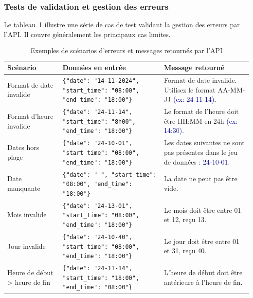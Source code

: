 \subsubsection{Tests de validation et gestion des erreurs}
Le tableau~\ref{tab:erreurs-api} illustre une série de cas de test validant la gestion des erreurs par l'API. Il couvre généralement les principaux cas limites.
\vspace{-1em}
\begin{table}[H]
	\centering
	\renewcommand{\arraystretch}{0.5}
	\caption{Exemples de scénarios d'erreurs et messages retournés par l'API}
	\vspace{-0.5em}
	\begin{tabularx}{\textwidth}{l X X}
		\toprule
		\textbf{Scénario} & \textbf{Données en entrée} & \textbf{Message retourné} \\
		\midrule
		Format de date invalide &
		\texttt{\{"date": "14-11-2024", "start\_time": "08:00", "end\_time": "18:00"\}} &
		Format de date invalide. Utilisez le format AA-MM-JJ \textcolor{darkblue}{(ex: 24-11-14)}. \\
		
		\midrule
		Format d'heure invalide &
		\texttt{\{"date": "24-11-14", "start\_time": "8h00", "end\_time": "18:00"\}} &
		Le format de l'heure doit être HH:MM en 24h \textcolor{darkblue}{(ex: 14:30)}. \\
		
		\midrule
		Dates hors plage &
		\texttt{\{"date": "24-10-01", "start\_time": "08:00", "end\_time": "18:00"\}} &
		Les dates suivantes ne sont pas présentes dans le jeu de données : \textcolor{darkblue}{24-10-01}. \\
		
		\midrule
		Date manquante &
		\texttt{\{"date": " ", "start\_time": "08:00", "end\_time": "18:00"\}} &
		La date ne peut pas être vide. \\
		
		\midrule
		Mois invalide &
		\texttt{\{"date": "24-13-01", "start\_time": "08:00", "end\_time": "18:00"\}} &
		Le mois doit être entre 01 et 12, reçu 13. \\
		
		\midrule
		Jour invalide &
		\texttt{\{"date": "24-10-40", "start\_time": "08:00", "end\_time": "18:00"\}} &
		Le jour doit être entre 01 et 31, reçu 40. \\
		
		\midrule
		Heure de début > heure de fin &
		\texttt{\{"date": "24-11-14", "start\_time": "18:00", "end\_time": "08:00"\}} &
		L'heure de début doit être antérieure à l'heure de fin. \\
		
		\bottomrule
	\end{tabularx}
	\label{tab:erreurs-api}
\end{table}


